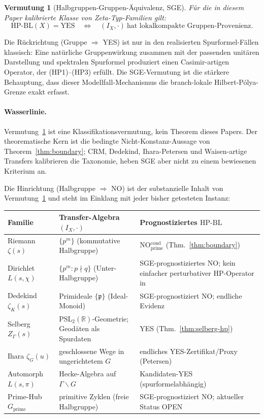 \documentclass[11pt]{article}
\newtheorem{conjecture}[theorem]{Vermutung}
\theoremstyle{definition}
\theoremstyle{remark}
\newcommand{\HBL}{\mathrm{HP\text{-}BL}}
\newcommand{\PSL}{\mathrm{PSL}}
\begin{document}
\begin{conjecture}[Halbgruppen-Gruppen-Äquivalenz, SGE]
\label{conj:sge}
Für die in diesem Paper kalibrierte Klasse von Zeta-Typ-Familien gilt:
\[
  \HBL(X) = \mathrm{YES}
  \quad\Longleftrightarrow\quad
  (I_X, \cdot)\ \text{hat lokalkompakte Gruppen-Provenienz}.
\]
\end{conjecture}

Die Rückrichtung (Gruppe $\Rightarrow$ YES) ist nur in den realisierten
Spurformel-Fällen klassisch: Eine natürliche Gruppenwirkung zusammen mit
der passenden unitären Darstellung und spektralen Spurformel produziert
einen Casimir-artigen Operator, der (HP1)--(HP3) erfüllt. Die
SGE-Vermutung ist die stärkere Behauptung, dass dieser
Modellfall-Mechanismus die branch-lokale Hilbert-P\'olya-Grenze exakt
erfasst.

\paragraph{Wasserlinie.}
Vermutung~\ref{conj:sge} ist eine Klassifikationsvermutung, kein
Theorem dieses Papers. Der theorematische Kern ist die bedingte
Nicht-Konstanz-Aussage von Theorem~\ref{thm:boundary}; CRM, Dedekind,
Ihara-Petersen und Waisen-artige Transfers kalibrieren die Taxonomie,
heben SGE aber nicht zu einem bewiesenen Kriterium an.

Die Hinrichtung (Halbgruppe $\Rightarrow$ NO) ist der
substanzielle Inhalt von Vermutung~\ref{conj:sge} und steht im Einklang
mit jeder bisher getesteten Instanz:

\begin{center}
\begin{tabular}{@{}>{\raggedright\arraybackslash}p{}
                  >{\raggedright\arraybackslash}p{}
                  >{\raggedright\arraybackslash}p{}@{}}
\toprule
Familie & Transfer-Algebra $(I_X, \cdot)$ & Prognostiziertes $\HBL$ \\
\midrule
Riemann $\zeta(s)$ & $\{p^m\}$ (kommutative Halbgruppe) & NO$_{\mathrm{prime}}^{\mathrm{cond}}$ (Thm.~\ref{thm:boundary}) \\
Dirichlet $L(s,\chi)$ & $\{p^m : p \nmid q\}$ (Unter-Halbgruppe) & SGE-prognostiziertes NO; kein einfacher perturbativer HP-Operator in \cite{PaleyWienerDirichlet} \\
Dedekind $\zeta_K(s)$ & Primideale $\{\mathfrak{p}\}$ (Ideal-Monoid) & SGE-prognostiziert NO; endliche Evidenz \\
Selberg $Z_\Gamma(s)$ & $\PSL_2(\mathbb{R})$-Geometrie; Geodäten als Spurdaten & YES (Thm.~\ref{thm:selberg-hp}) \\
Ihara $\zeta_G(u)$ & geschlossene Wege in ungerichtetem $G$ & endliches YES-Zertifikat/Proxy (Petersen) \\
Automorph $L(s,\pi)$ & Hecke-Algebra auf $\Gamma\backslash G$ & Kandidaten-YES (spurformelabhängig) \\
Prime-Hub $G_\mathrm{prime}$ & primitive Zyklen (freie Halbgruppe) & SGE-prognostiziert NO; aktueller Status OPEN \\
\bottomrule
\end{tabular}
\end{center}
\end{document}
